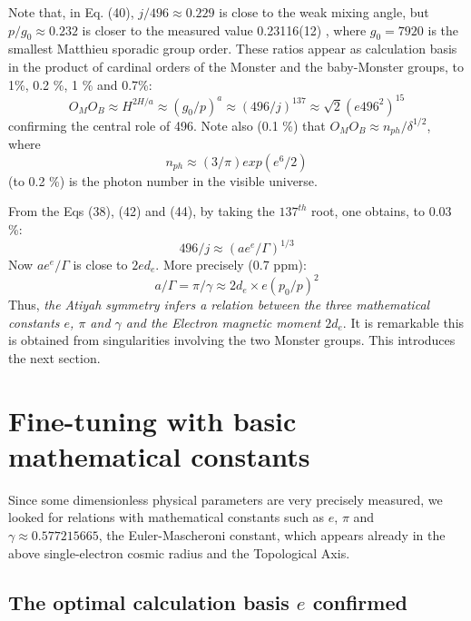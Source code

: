 \documentclass[twoside,draft]{article}
\begin{document}
\begin{sloppypar}
Note that, in Eq. (40), $j/496 \approx 0.229$ is close to the weak mixing angle, but $p/g_0 \approx 0.232$ is closer to the measured value 0.23116(12) \cite{Tanabashi}, where $g_0 = 7920 $ is the smallest Matthieu sporadic group order. These ratios appear as calculation basis in the product of cardinal orders of the Monster and the baby-Monster groups, to 1\%, 0.2 \%, 1 \% and 0.7\%:
\begin{equation}
O_MO_B\approx H^{2H/a} \approx (g_0/p)^a \approx (496/j)^{137} \approx \sqrt{2}(e496^2)^{15}
\end{equation}
confirming the central role of 496. Note also (0.1 \%) that $O_MO_B \approx  n_{ph}/\delta^{1/2}$, where $$n_{ph}\approx (3/\pi) exp(e^6/2)$$ (to 0.2 \%) is the photon number in the visible universe. 

From the Eqs (38), (42) and (44), by taking the $137^{th}$ root, one obtains, to 0.03 \%: $$496/j \approx (ae^e/\Gamma)^{1/3}$$
Now $ae^e/\Gamma$ is close to $2ed_e$. More precisely (0.7 ppm):
\begin{equation}
a/\Gamma = \pi/\gamma \approx 2d_e \times e (p_0/p)^2 
\end{equation}
Thus, \textit{the Atiyah symmetry infers a relation between the three mathematical constants $e$, $\pi$ and $\gamma$ and the Electron magnetic moment $2d_e$}. It is remarkable this is obtained from singularities involving the two Monster groups. This introduces the next section.

\section{Fine-tuning with basic mathematical constants}

Since some dimensionless physical parameters are very precisely measured, we looked for
relations with mathematical constants such as $e$, $\pi$ and $\gamma \approx
0.577215665$, the Euler-Mascheroni constant, which appears already in the above single-electron
cosmic radius and the Topological Axis.

\subsection {The optimal calculation basis $e$ confirmed}


\end{sloppypar}
\end{document}

